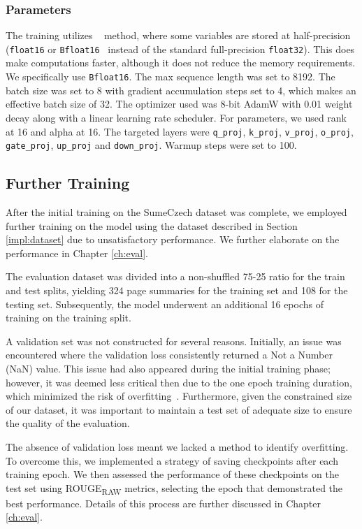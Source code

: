 \documentclass[english, ba, kiv, he, iso690numb, pdf, viewonly]{fasthesis}
\begin{document}
\subsubsection{Parameters}
The training utilizes ~\cite{micikevicius2018mixed} method, where some variables are stored at half-precision (\texttt{float16} or \texttt{Bfloat16}~\cite{kalamkar2019study} instead of the standard full-precision \texttt{float32}). This does make computations faster, although it does not reduce the memory requirements. We specifically use \texttt{Bfloat16}. The max sequence length was set to 8192. The batch size was set to 8 with gradient accumulation steps set to 4, which makes an effective batch size of 32. The optimizer used was 8-bit AdamW with 0.01 weight decay along with a linear learning rate scheduler. For  parameters, we used rank at 16 and alpha at 16. The targeted layers were \texttt{q\_proj}, \texttt{k\_proj}, \texttt{v\_proj}, \texttt{o\_proj}, \texttt{gate\_proj}, \texttt{up\_proj} and \texttt{down\_proj}. Warmup steps were set to 100.

\subsection{Further Training} \label{impl:mistral:furthertraining}
After the initial training on the SumeCzech dataset was complete, we employed further training on the model using the dataset described in Section \ref{impl:dataset} due to unsatisfactory performance. We further elaborate on the performance in Chapter \ref{ch:eval}.

The evaluation dataset was divided into a non-shuffled 75-25 ratio for the train and test splits, yielding 324 page summaries for the training set and 108 for the testing set. Subsequently, the model underwent an additional 16 epochs of training on the training split.

A validation set was not constructed for several reasons. Initially, an issue was encountered where the validation loss consistently returned a Not a Number (NaN) value. This issue had also appeared during the initial training phase; however, it was deemed less critical then due to the one epoch training duration, which minimized the risk of overfitting~\cite{komatsuzaki2019epoch}. Furthermore, given the constrained size of our dataset, it was important to maintain a test set of adequate size to ensure the quality of the evaluation. 

The absence of validation loss meant we lacked a method to identify overfitting. To overcome this, we implemented a strategy of saving checkpoints after each training epoch. We then assessed the performance of these checkpoints on the test set using ROUGE\textsubscript{RAW} metrics, selecting the epoch that demonstrated the best performance. Details of this process are further discussed in Chapter \ref{ch:eval}.
\end{document}
